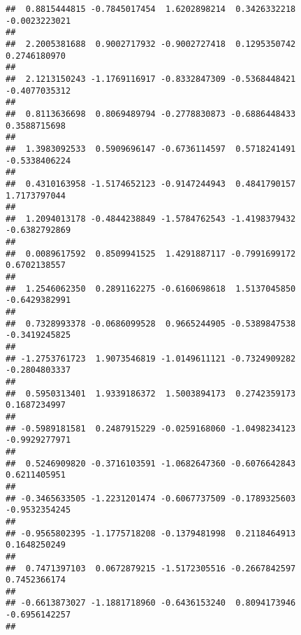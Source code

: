 \documentclass[]{article}
\begin{document}
\begin{verbatim}
##  0.8815444815 -0.7845017454  1.6202898214  0.3426332218 -0.0023223021 
##                                                                       
##  2.2005381688  0.9002717932 -0.9002727418  0.1295350742  0.2746180970 
##                                                                       
##  2.1213150243 -1.1769116917 -0.8332847309 -0.5368448421 -0.4077035312 
##                                                                       
##  0.8113636698  0.8069489794 -0.2778830873 -0.6886448433  0.3588715698 
##                                                                       
##  1.3983092533  0.5909696147 -0.6736114597  0.5718241491 -0.5338406224 
##                                                                       
##  0.4310163958 -1.5174652123 -0.9147244943  0.4841790157  1.7173797044 
##                                                                       
##  1.2094013178 -0.4844238849 -1.5784762543 -1.4198379432 -0.6382792869 
##                                                                       
##  0.0089617592  0.8509941525  1.4291887117 -0.7991699172  0.6702138557 
##                                                                       
##  1.2546062350  0.2891162275 -0.6160698618  1.5137045850 -0.6429382991 
##                                                                       
##  0.7328993378 -0.0686099528  0.9665244905 -0.5389847538 -0.3419245825 
##                                                                       
## -1.2753761723  1.9073546819 -1.0149611121 -0.7324909282 -0.2804803337 
##                                                                       
##  0.5950313401  1.9339186372  1.5003894173  0.2742359173  0.1687234997 
##                                                                       
## -0.5989181581  0.2487915229 -0.0259168060 -1.0498234123 -0.9929277971 
##                                                                       
##  0.5246909820 -0.3716103591 -1.0682647360 -0.6076642843  0.6211405951 
##                                                                       
## -0.3465633505 -1.2231201474 -0.6067737509 -0.1789325603 -0.9532354245 
##                                                                       
## -0.9565802395 -1.1775718208 -0.1379481998  0.2118464913  0.1648250249 
##                                                                       
##  0.7471397103  0.0672879215 -1.5172305516 -0.2667842597  0.7452366174 
##                                                                       
## -0.6613873027 -1.1881718960 -0.6436153240  0.8094173946 -0.6956142257 
##                                                                       

\end{verbatim}
\end{document}
